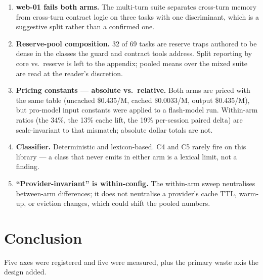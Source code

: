 \documentclass[11pt]{article}
\begin{document}
\begin{enumerate}
\item \textbf{web-01 fails both arms.} The multi-turn suite separates cross-turn memory from cross-turn contract logic on three tasks with one discriminant, which is a suggestive split rather than a confirmed one.
\item \textbf{Reserve-pool composition.} 32 of 69 tasks are reserve traps authored to be dense in the classes the guard and contract tools address. Split reporting by core vs.\ reserve is left to the appendix; pooled means over the mixed suite are read at the reader's discretion.
\item \textbf{Pricing constants --- absolute vs.\ relative.} Both arms are priced with the same table (uncached \$0.435/M, cached \$0.0033/M, output \$0.435/M), but pro-model input constants were applied to a flash-model run. Within-arm ratios (the 34\%, the 13\% cache lift, the 19\% per-session paired delta) are scale-invariant to that mismatch; absolute dollar totals are not.
\item \textbf{Classifier.} Deterministic and lexicon-based. C4 and C5 rarely fire on this library --- a class that never emits in either arm is a lexical limit, not a finding.
\item \textbf{``Provider-invariant'' is within-config.} The within-arm sweep neutralises between-arm differences; it does not neutralise a provider's cache TTL, warm-up, or eviction changes, which could shift the pooled numbers.
\end{enumerate}

\section{Conclusion}
\label{sec:conclusion}

Five axes were registered and five were measured, plus the primary waste axis the design added.
\end{document}
